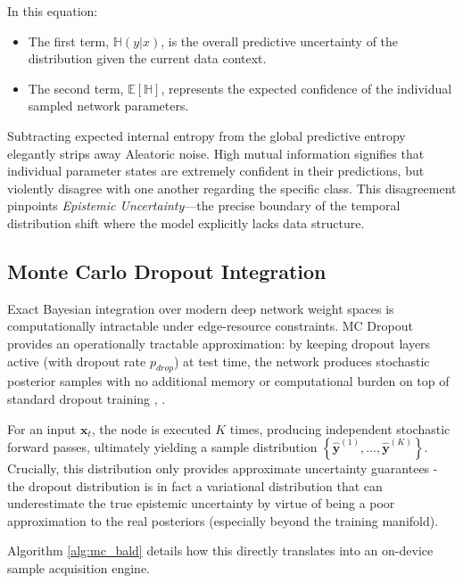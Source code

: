 \documentclass[conference]{IEEEtran}
\begin{document}
In this equation:
\begin{itemize}
    \item The first term, $\mathbb{H}(y|x)$, is the overall predictive uncertainty of the distribution given the current data context.
    \item The second term, $\mathbb{E}[\mathbb{H}]$, represents the expected confidence of the individual sampled network parameters.
\end{itemize}

Subtracting expected internal entropy from the global predictive entropy elegantly strips away Aleatoric noise. High mutual information signifies that individual parameter states are extremely confident in their predictions, but violently disagree with one another regarding the specific class. This disagreement pinpoints \textit{Epistemic Uncertainty}—the precise boundary of the temporal distribution shift where the model explicitly lacks data structure.

\subsection{Monte Carlo Dropout Integration}
Exact Bayesian integration over modern deep network weight spaces is computationally intractable under edge-resource constraints. MC Dropout provides an operationally tractable approximation: by keeping dropout layers active (with dropout rate $p_{drop}$) at test time, the network produces stochastic posterior samples with no additional memory or computational burden on top of standard dropout training \cite{b21}, \cite{b33}.

For an input $\mathbf{x}_t$, the node is executed $K$ times, producing independent stochastic forward passes, ultimately yielding a sample distribution $\left\{\hat{\mathbf{y}}^{(1)}, \ldots, \hat{\mathbf{y}}^{(K)}\right\}$. Crucially, this distribution only provides approximate uncertainty guarantees - the dropout distribution is in fact a variational distribution that can underestimate the true epistemic uncertainty by virtue of being a poor approximation to the real posteriors (especially beyond the training manifold).

Algorithm \ref{alg:mc_bald} details how this directly translates into an on-device sample acquisition engine.
\end{document}

